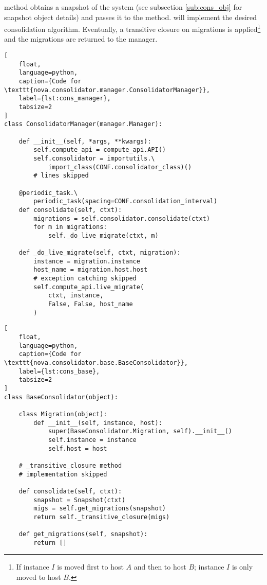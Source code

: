  method obtains a snapshot of the system (see subsection \ref{sub:cons_obj} for snapshot object details) and passes it to the  method.  will implement the desired consolidation algorithm. Eventually, a transitive closure on migrations is applied\footnote{If instance $I$ is moved first to host $A$ and then to host $B$; instance $I$ is only moved to host $B$.} and the migrations are returned to the manager.

\begin{lstlisting}[
	float,
	language=python,
	caption={Code for \texttt{nova.consolidator.manager.ConsolidatorManager}},
	label={lst:cons_manager},
	tabsize=2
]
class ConsolidatorManager(manager.Manager):

	def __init__(self, *args, **kwargs):
		self.compute_api = compute_api.API()
		self.consolidator = importutils.\
			import_class(CONF.consolidator_class)()
		# lines skipped

	@periodic_task.\
		periodic_task(spacing=CONF.consolidation_interval)
	def consolidate(self, ctxt):
		migrations = self.consolidator.consolidate(ctxt)
		for m in migrations:
			self._do_live_migrate(ctxt, m)

	def _do_live_migrate(self, ctxt, migration):
		instance = migration.instance
		host_name = migration.host.host
		# exception catching skipped
		self.compute_api.live_migrate(
			ctxt, instance,
			False, False, host_name
		)
\end{lstlisting}

\begin{lstlisting}[
	float,
	language=python,
	caption={Code for \texttt{nova.consolidator.base.BaseConsolidator}},
	label={lst:cons_base},
	tabsize=2
]
class BaseConsolidator(object):

	class Migration(object):
		def __init__(self, instance, host):
			super(BaseConsolidator.Migration, self).__init__()
			self.instance = instance
			self.host = host

	# _transitive_closure method
	# implementation skipped

	def consolidate(self, ctxt):
		snapshot = Snapshot(ctxt)
		migs = self.get_migrations(snapshot)
		return self._transitive_closure(migs)

	def get_migrations(self, snapshot):
		return []
\end{lstlisting}

